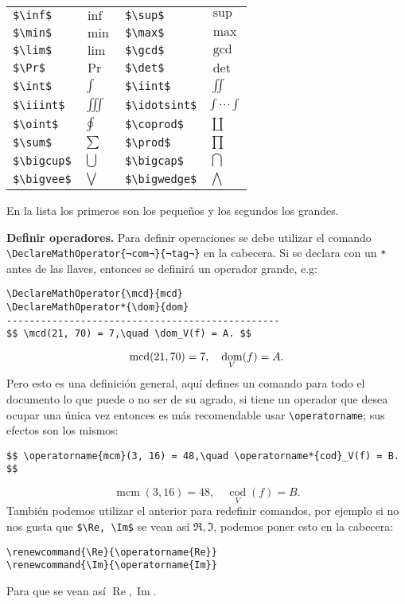 \begin{longtable}{llll}
	\lstinline|$\inf$|       & $\inf$       & \lstinline|$\sup$|        & $\sup$ \\
	\lstinline|$\min$|       & $\min$       & \lstinline|$\max$|        & $\max$ \\
	\lstinline|$\lim$|       & $\lim$       & \lstinline|$\gcd$|        & $\gcd$ \\
	\lstinline|$\Pr$|        & $\Pr$        & \lstinline|$\det$|        & $\det$ \\
	\lstinline|$\int$|       & $\int$       & \lstinline|$\iint$|       & $\iint$ \\
	\lstinline|$\iiint$|     & $\iiint$     & \lstinline|$\idotsint$|   & $\idotsint$ \\
	\lstinline|$\oint$|      & $\oint$      & \lstinline|$\coprod$|     & $\coprod$ \\
	\lstinline|$\sum$|       & $\sum$       & \lstinline|$\prod$|       & $\prod$ \\
	\lstinline|$\bigcup$|    & $\bigcup$    & \lstinline|$\bigcap$|     & $\bigcap$ \\
	\lstinline|$\bigvee$|    & $\bigvee$    & \lstinline|$\bigwedge$|   & $\bigwedge$ \\
\end{longtable}

En la lista los primeros son los pequeños y los segundos los grandes.

\textbf{Definir operadores.} Para definir operaciones se debe utilizar el comando \lstinline|\DeclareMathOperator{¬com¬}{¬tag¬}| en la cabecera. Si se declara con un \texttt{*} antes de las llaves, entonces se definirá un operador grande, e.g:
\begin{lstlisting}
\DeclareMathOperator{\mcd}{mcd}
\DeclareMathOperator*{\dom}{dom}
------------------------------------------------
$$ \mcd(21, 70) = 7,\quad \dom_V(f) = A. $$
\end{lstlisting}
$$ \mcd(21, 70) = 7,\quad \dom_V(f) = A. $$
Pero esto es una definición general, aquí defines un comando para todo el documento lo que puede o no ser de su agrado, si tiene un operador que desea ocupar una única vez entonces es más recomendable usar \lstinline|\operatorname|; sus efectos son los mismos:
\begin{lstlisting}
$$ \operatorname{mcm}(3, 16) = 48,\quad \operatorname*{cod}_V(f) = B. $$
\end{lstlisting}
$$ \operatorname{mcm}(3, 16) = 48,\quad \operatorname*{cod}_V(f) = B. $$
También podemos utilizar el anterior para redefinir comandos, por ejemplo si no nos gusta que \lstinline|$\Re, \Im$| se vean así $\Re, \Im$, podemos poner esto en la cabecera:
\begin{lstlisting}
\renewcommand{\Re}{\operatorname{Re}}
\renewcommand{\Im}{\operatorname{Im}}
\end{lstlisting}
Para que se vean así $\operatorname{Re}, \operatorname{Im}$.

